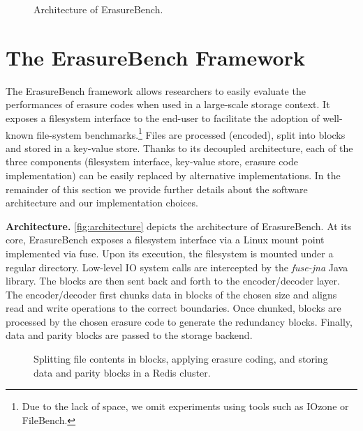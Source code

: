\begin{figure}[t]
    \centering
    
    \caption{Architecture of ErasureBench.}
    \label{fig:architecture}
\end{figure}

\section{The ErasureBench Framework}
\label{sec:erasure-tester}

The ErasureBench framework allows researchers to easily evaluate the performances of erasure codes when used in a large-scale storage context.
It exposes a filesystem interface to the end-user to facilitate the adoption of well-known file-system benchmarks.\footnote{Due to the lack of space, we omit experiments using tools such as IOzone or FileBench.}
Files are processed (encoded), split into blocks and stored in a key-value store.
Thanks to its decoupled architecture, each of the three components (filesystem interface, key-value store, erasure code implementation) can be easily replaced by alternative implementations. 
In the remainder of this section we provide further details about the software architecture and our implementation choices.

\textbf{Architecture.} \autoref{fig:architecture} depicts the architecture of ErasureBench.
At its core, ErasureBench exposes a filesystem interface via a Linux mount point implemented via \ac{fuse}. 
Upon its execution, the filesystem is mounted under a regular directory. 
Low-level IO system calls are intercepted by the \textit{fuse-jna} \autocite{fuse-jna} Java library.
The blocks are then sent back and forth to the encoder/decoder layer. 
The encoder/decoder first chunks data in blocks of the chosen size and aligns read and write operations to the correct boundaries. 
Once chunked, blocks are  processed by the chosen erasure code to generate the redundancy blocks. 
Finally, data and parity blocks are passed to the storage backend.

\begin{figure}[t]
    \centering
    
    \caption{Splitting file contents in blocks, applying erasure coding, and storing data and parity blocks in a Redis cluster.}
    \label{fig:blocks}
\end{figure}

